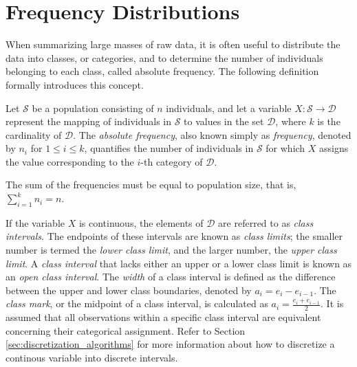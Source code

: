 
\section{Frequency Distributions}

When summarizing large masses of raw data, it is often useful to distribute the data into classes, or categories, and to determine the number of individuals belonging to each class, called absolute frequency. The following definition formally introduces this concept.

\begin{definition}
Let $\mathcal{S}$ be a population consisting of $n$ individuals, and let a variable $X: \mathcal{S} \rightarrow \mathcal{D}$ represent the mapping of individuals in $\mathcal{S}$ to values in the set $\mathcal{D}$, where $k$ is the cardinality of $\mathcal{D}$. The \emph{absolute frequency}, also known simply as \emph{frequency}, denoted by $n_i$ for $1 \leq i \leq k$, quantifies the number of individuals in $\mathcal{S}$ for which $X$ assigns the value corresponding to the $i$-th category of $\mathcal{D}$.
\end{definition}

The sum of the frequencies must be equal to population size, that is, $\sum_{i=1}^k n_i = n$.

If the variable $X$ is continuous, the elements of $\mathcal{D}$ are referred to as \emph{class intervals}. The endpoints of these intervals are known as \emph{class limits}; the smaller number is termed the \emph{lower class limit}, and the larger number, the \emph{upper class limit}. A \emph{class interval} that lacks either an upper or a lower class limit is known as an \emph{open class interval}. The \emph{width} of a class interval is defined as the difference between the upper and lower class boundaries, denoted by $a_i = e_i - e_{i-1}$. The \emph{class mark}, or the midpoint of a class interval, is calculated as $a_i = \frac{e_i + e_{i-1}}{2}$. It is assumed that all observations within a specific class interval are equivalent concerning their categorical assignment. Refer to Section \ref{sec:discretization_algorithms} for more information about how to discretize a continous variable into discrete intervals.

